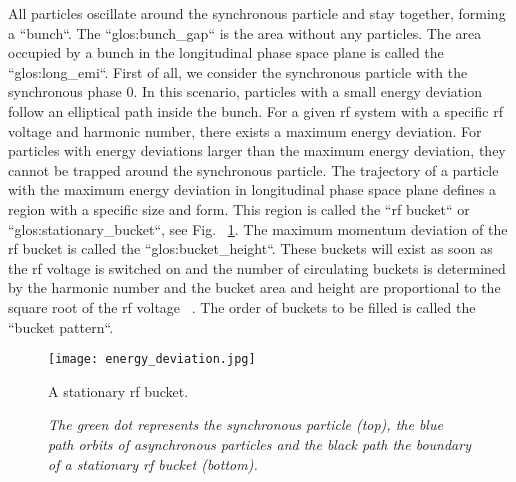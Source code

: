 All particles oscillate around the synchronous particle and stay together, forming a ``bunch``. The ``\gls{glos:bunch_gap}`` is the area without any particles. The area occupied by a bunch in the longitudinal phase space plane is called the ``\gls{glos:long_emi}``. First of all, we consider the synchronous particle with the synchronous phase $0$. In this scenario, particles with a small energy deviation follow an elliptical path inside the bunch. For a given rf system with a specific rf voltage and harmonic number, there exists a maximum energy deviation. For particles with energy deviations larger than the maximum energy deviation, they cannot be trapped around the synchronous particle. The trajectory of a particle with the maximum energy deviation in longitudinal phase space plane defines a region with a specific size and form. This region is called the ``rf bucket`` or ``\gls{glos:stationary_bucket}``, see Fig. ~\ref{energy_deviation}. The maximum momentum deviation of the rf bucket is called the ``\gls{glos:bucket_height}``. These buckets will exist as soon as the rf voltage is switched on and the number of circulating buckets is determined by the harmonic number and the bucket area and height are proportional to the square root of the rf voltage ~\cite{lee_accelerator_2011}. The order of buckets to be filled is called the ``bucket pattern``.
\begin{figure}[!htb]
   \centering   
   \texttt{[image: energy\_deviation.jpg]}
   \caption{A stationary rf bucket.}
	\caption*{\textsl{\small{The green dot represents the synchronous particle (top), the blue path orbits of asynchronous particles and the black path the boundary of a stationary rf bucket (bottom).}}}
   \label{energy_deviation}
\end{figure} 

